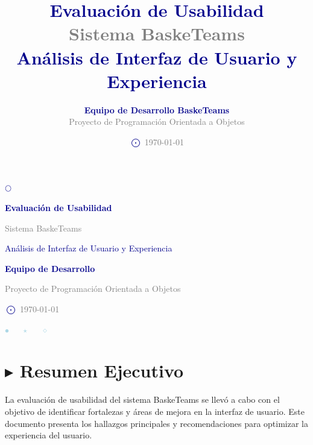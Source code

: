 \documentclass[12pt,a4paper]{article}
\title{
    \vspace{-1cm}
    \textcolor{darkblue}{\Huge\textbf{Evaluación de Usabilidad}}\\
    \vspace{0.5cm}
    \textcolor{gray}{\Large Sistema BaskeTeams}\\
    \vspace{0.3cm}
    \textcolor{darkblue}{\large Análisis de Interfaz de Usuario y Experiencia}
}
\author{
    \textcolor{darkblue}{\textbf{Equipo de Desarrollo BaskeTeams}}\\
    \vspace{0.2cm}
    \textcolor{gray}{Proyecto de Programación Orientada a Objetos}
}
\date{
    \vspace{0.3cm}
    \textcolor{darkblue}{$\bigodot$} \textcolor{gray}{\today}
}
\begin{document}
\begin{titlepage}
    \centering
    \vspace*{1cm}
    
    \textcolor{darkblue}{$\bigcirc$}
    \vspace{0.5cm}
    
    {\Huge\textbf{\textcolor{darkblue}{Evaluación de Usabilidad}}\par}
    \vspace{1cm}
    
    {\Large\textcolor{gray}{Sistema BaskeTeams}\par}
    \vspace{0.5cm}
    
    {\large\textcolor{darkblue}{Análisis de Interfaz de Usuario y Experiencia}\par}
    \vspace{2cm}
    
    {\Large\textbf{\textcolor{darkblue}{Equipo de Desarrollo}}\par}
    \vspace{0.5cm}
    {\large\textcolor{gray}{Proyecto de Programación Orientada a Objetos}\par}
    \vspace{1.5cm}
    
    {\large\textcolor{darkblue}{$\bigodot$} \textcolor{gray}{\today}\par}
    \vspace{1cm}
    
    \textcolor{lightblue}{$\bullet$ $\quad$ $\star$ $\quad$ $\diamond$}
    
    \vfill
\end{titlepage}

\tableofcontents
\newpage

\section{$\blacktriangleright$ Resumen Ejecutivo}

La evaluación de usabilidad del sistema BaskeTeams se llevó a cabo con el objetivo de identificar fortalezas y áreas de mejora en la interfaz de usuario. Este documento presenta los hallazgos principales y recomendaciones para optimizar la experiencia del usuario.
\end{document}
